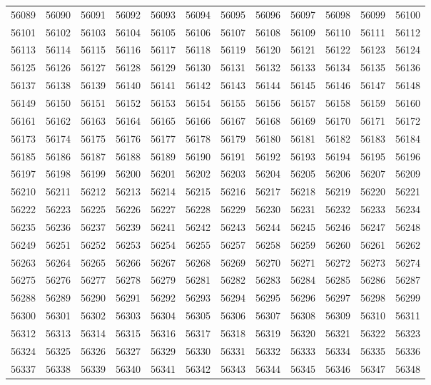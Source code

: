 \begin{center}
\begin{longtable}{llllllllllll}
56089 &56090 &56091 &56092 &56093 &56094 &56095 &56096 &56097 &56098 &56099 &56100 \\
56101 &56102 &56103 &56104 &56105 &56106 &56107 &56108 &56109 &56110 &56111 &56112 \\
56113 &56114 &56115 &56116 &56117 &56118 &56119 &56120 &56121 &56122 &56123 &56124 \\
56125 &56126 &56127 &56128 &56129 &56130 &56131 &56132 &56133 &56134 &56135 &56136 \\
56137 &56138 &56139 &56140 &56141 &56142 &56143 &56144 &56145 &56146 &56147 &56148 \\
56149 &56150 &56151 &56152 &56153 &56154 &56155 &56156 &56157 &56158 &56159 &56160 \\
56161 &56162 &56163 &56164 &56165 &56166 &56167 &56168 &56169 &56170 &56171 &56172 \\
56173 &56174 &56175 &56176 &56177 &56178 &56179 &56180 &56181 &56182 &56183 &56184 \\
56185 &56186 &56187 &56188 &56189 &56190 &56191 &56192 &56193 &56194 &56195 &56196 \\
56197 &56198 &56199 &56200 &56201 &56202 &56203 &56204 &56205 &56206 &56207 &56209 \\
56210 &56211 &56212 &56213 &56214 &56215 &56216 &56217 &56218 &56219 &56220 &56221 \\
56222 &56223 &56225 &56226 &56227 &56228 &56229 &56230 &56231 &56232 &56233 &56234 \\
56235 &56236 &56237 &56239 &56241 &56242 &56243 &56244 &56245 &56246 &56247 &56248 \\
56249 &56251 &56252 &56253 &56254 &56255 &56257 &56258 &56259 &56260 &56261 &56262 \\
56263 &56264 &56265 &56266 &56267 &56268 &56269 &56270 &56271 &56272 &56273 &56274 \\
56275 &56276 &56277 &56278 &56279 &56281 &56282 &56283 &56284 &56285 &56286 &56287 \\
56288 &56289 &56290 &56291 &56292 &56293 &56294 &56295 &56296 &56297 &56298 &56299 \\
56300 &56301 &56302 &56303 &56304 &56305 &56306 &56307 &56308 &56309 &56310 &56311 \\
56312 &56313 &56314 &56315 &56316 &56317 &56318 &56319 &56320 &56321 &56322 &56323 \\
56324 &56325 &56326 &56327 &56329 &56330 &56331 &56332 &56333 &56334 &56335 &56336 \\
56337 &56338 &56339 &56340 &56341 &56342 &56343 &56344 &56345 &56346 &56347 &56348 \\

\end{longtable}
\end{center}
